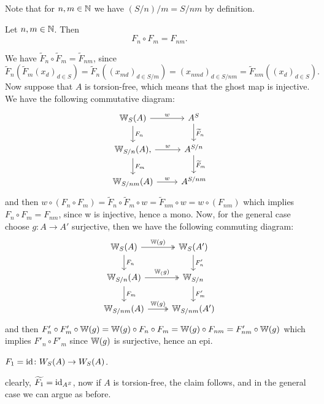 Note that for $n,m \in \mathbb{N}$ we have $(S/n)/m = S/nm$ by definition.
\begin{lemma} \label{lem: F_n after F_m is F_{nm}}
    Let $n,m \in \mathbb{N}$.
    Then 
    \[F_n \circ F_m = F_{nm}.\]
\end{lemma}
\begin{beweis}
    We have $\widetilde{F}_n \circ \widetilde{F}_m = \widetilde{F}_{nm}$,
    since
    \[
       \widetilde{F}_n(\widetilde{F}_m(x_d)_{d \in S}) 
       = \widetilde{F}_n((x_{md})_{d \in S/m})
       = (x_{nmd})_{d \in S/nm}
       = \widetilde{F}_{nm}((x_d)_{d \in S}).
    \]
    Now suppose that $A$ is torsion-free, which means that the ghost map is injective.
    We have the following commutative diagram:
    \[
        \begin{tikzcd}
            \W_S(A) \arrow[r,"w"] \arrow[d,"F_n"] 
              & A^S \arrow[d,"\widetilde{F}_n"] \\
            \W_{S/n}(A) \arrow[r,"w"], \ar[d,"F_m"]
              & A^{S/n} \ar[d,"\widetilde{F}_m"]\\
            \W_{S/nm}(A) \ar[r,"w"]
            & A^{S/nm}
        \end{tikzcd}      
    \]
    and then $w \circ (F_n \circ F_m) = \widetilde{F}_n \circ \widetilde{F}_m \circ w 
    = \widetilde{F}_{nm} \circ w = w \circ (F_{nm})$
    which implies $F_n \circ F_m = F_{nm}$, since w is injective, hence a mono.
    Now, for the general case choose $g \colon A \to A'$ surjective, then we have the following
    commuting diagram:
    \[
        \begin{tikzcd}
            \W_S(A) \arrow[r,"\W(g)",twoheadrightarrow] \arrow[d,"F_n"] 
              & \W_S(A') \arrow[d,"F'_n"] \\
            \W_{S/n}(A) \arrow[r,"\W_(g)",twoheadrightarrow] \ar[d,"F_{m}"]
              & \W_{S/n} \ar[d,"F'_m"] \\
              \W_{S/nm}(A) \ar[r,"\W(g)",twoheadrightarrow] 
              & \W_{S/nm}(A')
        \end{tikzcd}
    \]
    and then $F'_n \circ F'_m \circ \mathbb{W}(g) = \mathbb{W}(g) \circ F_n \circ F_m = \mathbb{W}(g) \circ F_{nm}
    = F'_{nm} \circ \mathbb{W}(g)$ which implies $F'_n \circ F'_m$ since $\mathbb{W}(g)$ is surjective, hence an epi.
\end{beweis}
\begin{lemma}\label{lem: F_1 = id}
    $F_1 = \operatorname{id} \colon W_S(A) \to W_S(A)$.
\end{lemma}
\begin{beweis}
    clearly, $\widetilde{F_1} = \operatorname{id}_{A^S}$, now if $A$ is torsion-free, the claim follows,
    and in the general case we can argue as before.
\end{beweis}
